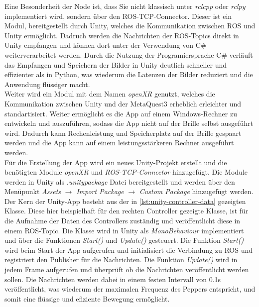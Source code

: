 \noindent
Eine Besonderheit der Node ist, dass Sie nicht klassisch unter \textit{rclcpp} oder \textit{rclpy} implementiert wird, sondern über den \ac{ROS}-\ac{TCP}-Connector. Dieser ist ein Modul, bereitgestellt durch Unity, welches die Kommunikation zwischen \ac{ROS} und Unity ermöglicht. Dadruch werden die Nachrichten der \ac{ROS}-Topics direkt in Unity empfangen und können dort unter der Verwendung von C\# weiterverarbeitet werden. Durch die Nutzung der Programiersprache C\# verläuft das Empfangen und Speichern der Bilder in Unity deutlich schneller und effizienter als in Python, was wiederum die Latenzen der Bilder reduziert und die Anwendung flüssiger macht.
\\

\noindent
Weiter wird ein Modul mit dem Namen \textit{openXR} genutzt, welches die Kommunikation zwischen Unity und der MetaQuest3 erheblich erleichter und standartisiert. Weiter ermöglicht es die App auf einem Windows-Rechner zu entwickeln und auszuführen, sodass die App nicht auf der Brille selbst ausgeführt wird. Dadurch kann Rechenleistung und Speicherplatz auf der Brille gespaart werden und die App kann auf einem leistungsstärkeren Rechner ausgeführt werden.
\\

\noindent
Für die Erstellung der App wird ein neues Unity-Projekt erstellt und die benötigten Module \textit{openXR} und \textit{ROS-TCP-Connector} hinzugefügt. Die Module werden in Unity als \textit{.unitypackage} Datei bereitgestellt und werden über den Menüpunkt \textit{Assets} $\rightarrow$ \textit{Import Package} $\rightarrow$ \textit{Custom Package} hinzugefügt werden.
\\

\noindent
Der Kern der Unity-App besteht aus der in \autoref{lst:unity-controller-data} gezeigten Klasse. Diese hier beispielhaft für den rechten Controller gezeigte Klasse, ist für die Aufnahme der Daten des Controllers zuständig und veröffentlicht diese in einem \ac{ROS}-Topic. Die Klasse wird in Unity als \textit{MonoBehaviour} implementiert und über die Funktionen \textit{Start()} und \textit{Update()} gesteuert. Die Funktion \textit{Start()} wird beim Start der App aufgerufen und initialisiert die Verbindung zu \ac{ROS} und registriert den Publisher für die Nachrichten. Die Funktion \textit{Update()} wird in jedem Frame aufgerufen und überprüft ob die Nachrichten veröffentlicht werden sollen. Die Nachrichten werden dabei in einem festen Intervall von 0.1s veröffentlicht, was wiederum der maximalen Frequenz des Peppers entspricht, und somit eine flüssige und efiziente Bewegung ermöglicht.
\\

